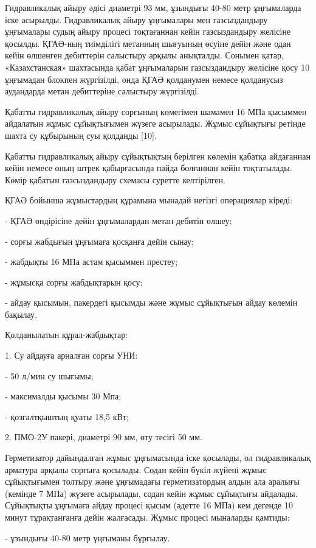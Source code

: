 \begin{multicols}{2}
Гидравликалық айыру әдісі диаметрі 93 мм, ұзындығы 40-80 метр
ұңғымаларда іске асырылды. Гидравликалық айыру ұңғымалары мен
газсыздандыру ұңғымалары судың айыру процесі тоқтағаннан кейін
газсыздандыру желісіне қосылды. ҚГАӘ-ның тиімділігі метанның шығуының
өсуіне дейін және одан кейін өлшенген дебиттерін салыстыру арқылы
анықталды. Сонымен қатар, «Казахстанская» шахтасында қабат ұңғымаларын
газсыздандыру желісіне қосу 10 ұңғымадан блокпен жүргізілді, онда ҚГАӘ
қолданумен немесе қолданусыз аудандарда метан дебиттеріне салыстыру
жүргізілді.

Қабатты гидравликалық айыру сорғының көмегімен шамамен 16 МПа қысыммен
айдалатын жұмыс сұйықтығымен жүзеге асырылады. Жұмыс сұйықтығы ретінде
шахта су құбырының суы қолданды {[}10{]}.

Қабатты гидравликалық айыру сұйықтықтың берілген көлемін қабатқа
айдағаннан кейін немесе оның штрек қабырғасында пайда болғаннан кейін
тоқтатылады. Көмір қабатын газсыздандыру схемасы суретте келтірілген.

ҚГАӘ бойынша жұмыстардың құрамына мынадай негізгі операциялар кіреді:

- ҚГАӘ өндірісіне дейін ұңғымалардан метан дебитін өлшеу;

- сорғы жабдығын ұңғымаға қосқанға дейін сынау;

- жабдықты 16 МПа астам қысыммен престеу;

- жұмысқа сорғы жабдықтарын қосу;

- айдау қысымын, пакердегі қысымды және жұмыс сұйықтығын айдау көлемін
бақылау.

Қолданылатын құрал-жабдықтар:

1. Су айдауға арналған сорғы УНИ:

- 50 л/мин су шығымы;

- максималды қысымы 30 Мпа;

- қозғалтқыштың қуаты 18,5 кВт;

2. ПМО-2У пакері, диаметрі 90 мм, өту тесігі 50 мм.

Герметизатор дайындалған жұмыс ұңғымасында іске қосылады, ол
гидравликалық арматура арқылы сорғыға қосылады. Содан кейін бүкіл жүйені
жұмыс сұйықтығымен толтыру және ұңғымадағы герметизатордың алдын ала
аралығы (кемінде 7 МПа) жүзеге асырылады, содан кейін жұмыс сұйықтығы
айдалады. Сұйықтықты ұңғымаға айдау процесі қысым (әдетте 16 МПа) кем
дегенде 10 минут тұрақтанғанға дейін жалғасады. Жұмыс процесі мыналарды
қамтиды:

- ұзындығы 40-80 метр ұңғыманы бұрғылау.


\end{multicols}

